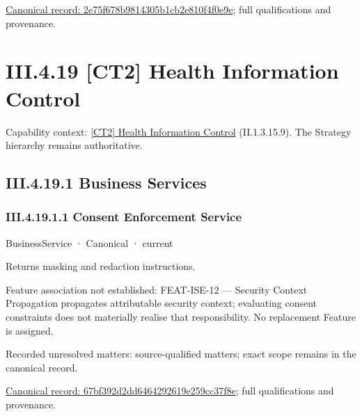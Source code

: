 {\footnotesize \href{../../../../continuum/business/business-function/2e75f678b9814305b1cb2e810f4f0e9e.md}{Canonical record: 2e75f678b9814305b1cb2e810f4f0e9e}; full qualifications and provenance.}\par
\section*{III.4.19 [CT2] Health Information Control}
\label{navigation:III.4.19}

{\small Capability context: \hyperref[element:44cc0e17ad534675bf26dce6e46a68ff]{[CT2] Health Information Control} (II.1.3.15.9). The Strategy hierarchy remains authoritative.}\par
\subsection*{III.4.19.1 Business Services}
\label{navigation:III.4.19.1}

\subsubsection*{III.4.19.1.1 Consent Enforcement Service}
\label{navigation:III.4.19.1.1}

\label{element:67bf392d2dd6464292619e259cc37f8e}
{\small BusinessService · Canonical · current}\par

Returns masking and redaction instructions.



Feature association not established: FEAT-ISE-12 — Security Context Propagation propagates attributable security context; evaluating consent constraints does not materially realise that responsibility. No replacement Feature is assigned.


{\small Recorded unresolved matters: source-qualified matters; exact scope remains in the canonical record.}\par
{\footnotesize \href{../../../../continuum/business/business-service/67bf392d2dd6464292619e259cc37f8e.md}{Canonical record: 67bf392d2dd6464292619e259cc37f8e}; full qualifications and provenance.}\par

